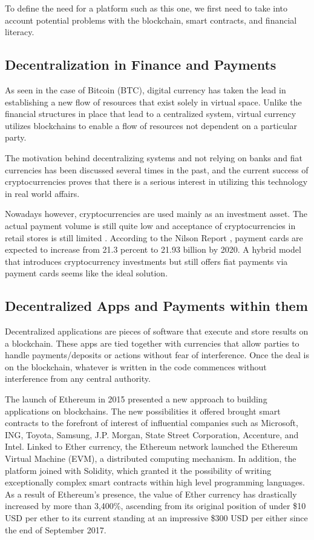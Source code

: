 \documentclass[english]{article}
\begin{document}
To define the need for a platform such as this one, we first need to take into account potential problems with the blockchain, smart contracts, and financial literacy. 

\subsection{Decentralization in Finance and Payments}

As seen in the case of Bitcoin (BTC), digital currency has taken the lead in establishing a new flow of resources that exist solely in  virtual space. Unlike the financial structures in place that lead to a centralized system, virtual currency utilizes blockchains to enable a flow of resources not dependent on a particular party.

The motivation behind decentralizing systems and not relying on banks and fiat currencies has been discussed several times in the past, and the current success of cryptocurrencies proves that there is a serious interest in utilizing this technology in real world affairs.

Nowadays however, cryptocurrencies are used mainly as an investment asset. The actual payment volume is still quite low and acceptance of cryptocurrencies in retail stores is still limited \cite{bitcoinaccpetance}. According to the Nilson Report \cite{NilsonReport}, payment cards are expected to increase from 21.3 percent to 21.93 billion by 2020. A hybrid model that introduces cryptocurrency investments but still offers fiat payments via payment cards seems like the ideal solution.

\subsection{Decentralized Apps and Payments within them}
Decentralized applications are pieces of software that execute and store results on a blockchain. These apps are tied together with currencies that allow parties to handle payments/deposits or actions without fear of interference. Once the deal is on the blockchain, whatever is written in the code commences without interference from any central authority. 
						
The launch of Ethereum in 2015 presented a new approach to building applications on blockchains. The new possibilities it offered brought smart contracts to the forefront of interest of influential companies such as Microsoft, ING, Toyota, Samsung, J.P. Morgan, State Street Corporation, Accenture, and Intel. Linked to Ether currency, the Ethereum network launched the Ethereum Virtual Machine (EVM), a distributed computing mechanism. In addition, the platform joined with Solidity, which granted it the possibility of writing exceptionally complex smart contracts within high level programming languages. As a result of Ethereum’s presence, the value of Ether currency has drastically increased by more than 3,400\%, ascending from its original position of under \$10 USD per ether to its current standing at an impressive \$300 USD per either since the end of September 2017.
\end{document}

